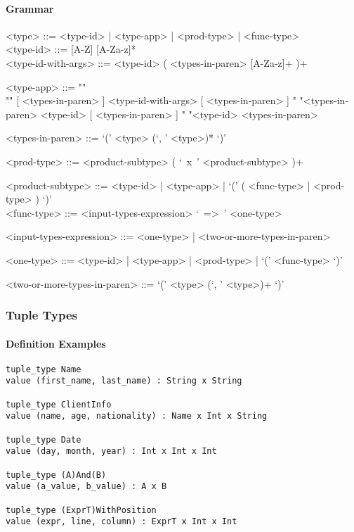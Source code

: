 \documentclass{article}
\begin{document}
\paragraph{Grammar}
\begin{grammar}
<type> ::=
<type-id> | <type-app> | <prod-type> | <func-type> \\

<type-id> ::= [A-Z] [A-Za-z]* \\ 
 
<type-id-with-args> ::= 
<type-id> ( <types-in-paren> [A-Za-z]+ )+

<type-app> ::= ""\\""
[ <types-in-paren> ] <type-id-with-args> [ <types-in-paren> ]
\alt " "<types-in-paren> <type-id> [ <types-in-paren> ]
\alt " "<type-id> <types-in-paren>

<types-in-paren> ::= `(' <type> (`, ' <type>)* `)'

<prod-type> ::= <product-subtype> ( `\ x\ ' <product-subtype> )+

<product-subtype> ::=
<type-id> | <type-app> | `(' ( <func-type> | <prod-type> ) `)' \\

<func-type> ::= <input-types-expression> `\ =>\ ' <one-type>

<input-types-expression> ::= <one-type> | <two-or-more-types-in-paren>

<one-type> ::= <type-id> | <type-app> | <prod-type> | `(' <func-type> `)'

<two-or-more-types-in-paren> ::=  `(' <type> (`, ' <type>)+ `)'
\end{grammar}

\subsubsection{Tuple Types}
\label{subsubsec:tupts}

\paragraph{Definition Examples}

\begin{verbatim}
tuple_type Name
value (first_name, last_name) : String x String

tuple_type ClientInfo
value (name, age, nationality) : Name x Int x String

tuple_type Date
value (day, month, year) : Int x Int x Int

tuple_type (A)And(B)
value (a_value, b_value) : A x B

tuple_type (ExprT)WithPosition
value (expr, line, column) : ExprT x Int x Int
\end{verbatim}
\end{document}
